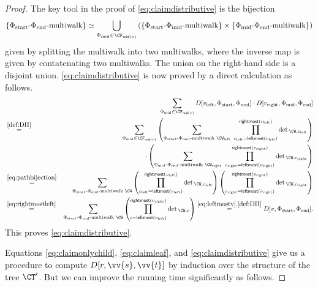 \begin{proof}
The key tool in the proof of \eqref{eq:claimdistributive} is the bijection
\begin{equation}\label{eq:pathbijection}
\{\Phi_\text{start}\text{-}\Phi_\text{end}\text{-multiwalk}\} \simeq \bigcup_{\Phi_\text{mid} \in \CF_{\textsf{mid}(v)}} \left(\{\Phi_\text{start}\text{-}\Phi_\text{mid}\text{-multiwalk}\} \times \{\Phi_\text{mid}\text{-}\Phi_\text{end}\text{-multiwalk}\}\right)
\end{equation}
given by splitting the multiwalk into two multiwalks, where the inverse map is given by contatenating two multiwalks. The union on the right-hand side is a disjoint union.
\eqref{eq:claimdistributive} is now proved by a direct calculation as follows.
\begin{eqnarray*}
&&\sum_{\Phi_\text{mid} \in \CF_{\textsf{mid}(v)}} D[v_\text{left},\Phi_\text{start}, \Phi_\text{mid}] \cdot D[v_\text{right},\Phi_\text{mid}, \Phi_\text{end}]
\\
%
%
%
%
%
%
%
%
&\stackrel{\eqref{def:DII}}{=}&
\sum_{\Phi_\text{mid} \in \CF_{\textsf{mid}(v)}}
\left(\sum_{\Phi_\text{start}\text{-}\Phi_\text{mid}\text{-multiwalk } \CW_\text{left}} \ 
\prod_{c_\text{left}=\textsf{leftmost}(v_\text{left})}^{\textsf{rightmost}(v_\text{left})}\det{}_{\CW,c_\text{left}}
\right)\\
&&\hspace{2cm}
\cdot\left(\sum_{\Phi_\text{mid}\text{-}\Phi_\text{end}\text{-multiwalk } \CW_\text{right}} \ 
\prod_{c_\text{right}=\textsf{leftmost}(v_\text{right})}^{\textsf{rightmost}(v_\text{right})}\det{}_{\CW,c_\text{right}}\right)
\\
&\stackrel{\eqref{eq:pathbijection}}{=}&
\sum_{\Phi_\text{start}\text{-}\Phi_\text{end}\text{-multiwalk } \CW} \left(\prod_{c_\text{left}=\textsf{leftmost}(v_\text{left})}^{\textsf{rightmost}(v_\text{left})}\det{}_{\CW,c_\text{left}}\right)
\left(\prod_{c_\text{right}=\textsf{leftmost}(v_\text{right})}^{\textsf{rightmost}(v_\text{right})}\det{}_{\CW,c_\text{right}}\right)
\\
&\stackrel{\eqref{eq:rightmostleft}}{=}&
\sum_{\Phi_\text{start}\text{-}\Phi_\text{end}\text{-multiwalk } \CW} \left(\prod_{c=\textsf{leftmost}(v_\text{left})}^{\textsf{rightmost}(v_\text{right})}\det{}_{\CW,c}\right)
\stackrel{\eqref{eq:leftmostv},\eqref{def:DII}}{=} D[v,\Phi_\text{start},\Phi_\text{end}].
\end{eqnarray*}
This proves \eqref{eq:claimdistributive}.

Equations \eqref{eq:claimonlychild}, \eqref{eq:claimleaf}, and \eqref{eq:claimdistributive} give us a procedure to compute $D[r, \vv{s}, \vv{t}]$ by induction over the structure of the tree $\CT'$.
But we can improve the running time significantly as follows.


\end{proof}
